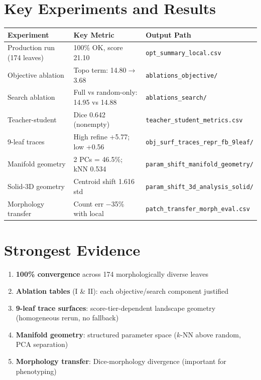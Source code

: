 \documentclass[11pt,a4paper]{article}
\newcommand{\filepath}[1]{\texttt{\small #1}}
\begin{document}
\section{Key Experiments and Results}

\begin{tabular}{p{4cm}p{4cm}p{5.5cm}}
\toprule
\textbf{Experiment} & \textbf{Key Metric} & \textbf{Output Path} \\
\midrule
Production run (174 leaves) & 100\% OK, score 21.10 & \filepath{opt\_summary\_local.csv} \\
Objective ablation & Topo term: 14.80$\to$3.68 & \filepath{ablations\_objective/} \\
Search ablation & Full vs random-only: 14.95 vs 14.88 & \filepath{ablations\_search/} \\
Teacher-student & Dice 0.642 (nonempty) & \filepath{teacher\_student\_metrics.csv} \\
9-leaf traces & High refine +5.77; low +0.56 & \filepath{obj\_surf\_traces\_repr\_fb\_9leaf/} \\
Manifold geometry & 2 PCs = 46.5\%; kNN 0.534 & \filepath{param\_shift\_manifold\_geometry/} \\
Solid-3D geometry & Centroid shift 1.616 std & \filepath{param\_shift\_3d\_analysis\_solid/} \\
Morphology transfer & Count err $-$35\% with local & \filepath{patch\_transfer\_morph\_eval.csv} \\
\bottomrule
\end{tabular}

\section{Strongest Evidence}

\begin{enumerate}[nosep]
  \item \textbf{100\% convergence} across 174 morphologically diverse leaves
  \item \textbf{Ablation tables} (I \& II): each objective/search component justified
  \item \textbf{9-leaf trace surfaces}: score-tier-dependent landscape geometry (homogeneous rerun, no fallback)
  \item \textbf{Manifold geometry}: structured parameter space ($k$-NN above random, PCA separation)
  \item \textbf{Morphology transfer}: Dice-morphology divergence (important for phenotyping)
\end{enumerate}
\end{document}
